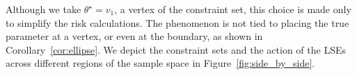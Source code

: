 \documentclass[11pt]{article}
\theoremstyle{plain}
\theoremstyle{definition}
\begin{document}
 Although we take $\theta^\star=v_1$, a vertex of the constraint set, this choice is made only to simplify the risk calculations. The phenomenon is not tied to placing the true parameter at a vertex, or even at the boundary, as shown in Corollary~\ref{cor:ellipse}. We depict the constraint sets and the action of the LSEs across different regions of the sample space in Figure~\ref{fig:side_by_side}.

    







\end{document}
